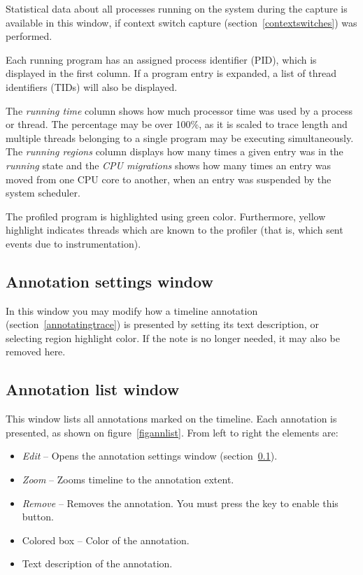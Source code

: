 \documentclass[hidelinks,titlepage,a4paper]{article}
\begin{document}
Statistical data about all processes running on the system during the capture is available in this window, if context switch capture (section~\ref{contextswitches}) was performed.

Each running program has an assigned process identifier (PID), which is displayed in the first column. If a program entry is expanded, a list of thread identifiers (TIDs) will also be displayed.

The \emph{running time} column shows how much processor time was used by a process or thread. The percentage may be over 100\%, as it is scaled to trace length and multiple threads belonging to a single program may be executing simultaneously. The \emph{running regions} column displays how many times a given entry was in the \emph{running} state and the \emph{CPU migrations} shows how many times an entry was moved from one CPU core to another, when an entry was suspended by the system scheduler.

The profiled program is highlighted using green color. Furthermore, yellow highlight indicates threads which are known to the profiler (that is, which sent events due to instrumentation).

\subsection{Annotation settings window}
\label{annotationsettings}

In this window you may modify how a timeline annotation (section~\ref{annotatingtrace}) is presented by setting its text description, or selecting region highlight color. If the note is no longer needed, it may also be removed here.

\subsection{Annotation list window}
\label{annotationlist}

This window lists all annotations marked on the timeline. Each annotation is presented, as shown on figure~\ref{figannlist}. From left to right the elements are:

\begin{itemize}
\item \emph{\faEdit{} Edit} -- Opens the annotation settings window (section~\ref{annotationsettings}).
\item \emph{\faMicroscope{} Zoom} -- Zooms timeline to the annotation extent.
\item \emph{\faTrash*{} Remove} -- Removes the annotation. You must press the \keys{\ctrl} key to enable this button.
\item Colored box -- Color of the annotation.
\item Text description of the annotation.
\end{itemize}
\end{document}
